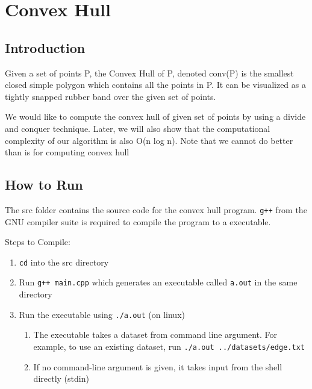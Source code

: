 \hypertarget{convex-hull}{%
\section{Convex Hull}\label{convex-hull}}

\hypertarget{introduction}{%
\subsection{Introduction}\label{introduction}}

Given a set of points P, the Convex Hull of P, denoted conv(P) is the
smallest closed simple polygon which contains all the points in P. It
can be visualized as a tightly snapped rubber band over the given set of
points.

We would like to compute the convex hull of given set of points by using
a divide and conquer technique. Later, we will also show that the
computational complexity of our algorithm is also O(n log n). Note that
we cannot do better than is for computing convex hull

\hypertarget{how-to-run}{%
\subsection{How to Run}\label{how-to-run}}

The src folder contains the source code for the convex hull program.
\texttt{g++} from the GNU compiler suite is required to compile the
program to a executable.

Steps to Compile:

\begin{enumerate}
\def\labelenumi{\arabic{enumi})}
\tightlist
\item
  \texttt{cd} into the src directory
\item
  Run \texttt{g++\ main.cpp} which generates an executable called
  \texttt{a.out} in the same directory
\item
  Run the executable using \texttt{./a.out} (on linux)

  \begin{enumerate}
  \def\labelenumii{\arabic{enumii})}
  \tightlist
  \item
    The executable takes a dataset from command line argument. For
    example, to use an existing dataset, run
    \texttt{./a.out\ ../datasets/edge.txt}
  \item
    If no command-line argument is given, it takes input from the shell
    directly (stdin)
  \end{enumerate}
\end{enumerate}

